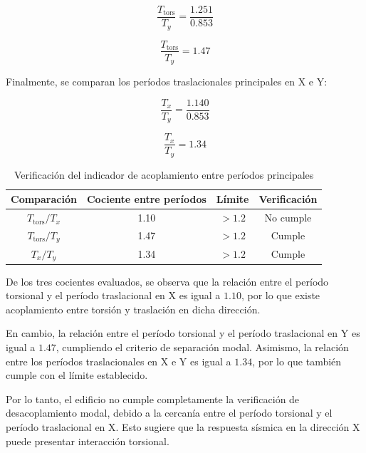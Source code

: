 \begin{equation}
\frac{T_{\text{tors}}}{T_y} = \frac{1.251}{0.853}
\end{equation}

\begin{equation}
\frac{T_{\text{tors}}}{T_y} = 1.47
\end{equation}

Finalmente, se comparan los períodos traslacionales principales en X e Y:

\begin{equation}
\frac{T_x}{T_y} = \frac{1.140}{0.853}
\end{equation}

\begin{equation}
\frac{T_x}{T_y} = 1.34
\end{equation}

\begin{table}[H]
\centering
\caption{Verificación del indicador de acoplamiento entre períodos principales}
\begin{tabular}{cccc}
\hline
Comparación & Cociente entre períodos & Límite & Verificación \\
\hline
$T_{\text{tors}}/T_x$ & 1.10 & $> 1.2$ & No cumple \\
$T_{\text{tors}}/T_y$ & 1.47 & $> 1.2$ & Cumple \\
$T_x/T_y$ & 1.34 & $> 1.2$ & Cumple \\
\hline
\end{tabular}
\end{table}

De los tres cocientes evaluados, se observa que la relación entre el período torsional y el período traslacional en X es igual a $1.10$, por lo que existe acoplamiento entre torsión y traslación en dicha dirección.

En cambio, la relación entre el período torsional y el período traslacional en Y es igual a $1.47$, cumpliendo el criterio de separación modal. Asimismo, la relación entre los períodos traslacionales en X e Y es igual a $1.34$, por lo que también cumple con el límite establecido.

Por lo tanto, el edificio no cumple completamente la verificación de desacoplamiento modal, debido a la cercanía entre el período torsional y el período traslacional en X. Esto sugiere que la respuesta sísmica en la dirección X puede presentar interacción torsional.

